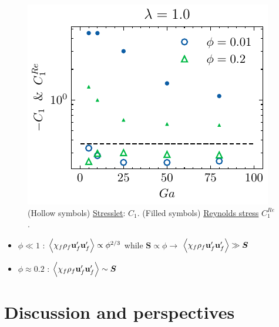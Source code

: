 \documentclass{sintefbeamer}
\begin{document}
\begin{frame}
  \begin{figure}[h!]
    \centering
    \includegraphics[height = 0.25\textwidth]{image/HOMOGENEOUS_final/PA/Sdev_diapo_l_10.pdf}
    \caption{
      (Hollow symbols) \underline{Stresslet}: $C_1$. 
      (Filled symbols) \underline{Reynolds stress} $C_1^{Re}$. 
     }
\end{figure}
\begin{itemize}
\item $\phi \ll 1$ : $\left<\chi_f\rho_f\textbf{u}_f'\textbf{u}_f'\right>\propto \phi^{2/3}$ while $\bm S \propto \phi \rightarrow$   $\left<\chi_f\rho_f\textbf{u}_f'\textbf{u}_f'\right>\gg \bm S$
\item $\phi \approx 0.2$ : $\left<\chi_f\rho_f\textbf{u}_f'\textbf{u}_f'\right>\sim \bm S$
\end{itemize}
\end{frame}

\section{Discussion and perspectives}
\end{document}
